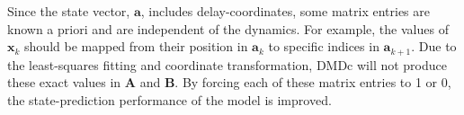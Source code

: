     Since the state vector, $\bm{a}$, includes delay-coordinates, some matrix entries are known a priori and are independent of the dynamics. 
    For example, the values of $\bm{x}_{k}$ should be mapped from their position in $\bm{a}_k$ to specific indices in $\bm{a}_{k+1}$. 
    Due to the least-squares fitting and coordinate transformation, DMDc will not produce these exact values in $\bm{A}$ and $\bm{B}$. 
    By forcing each of these matrix entries to 1 or 0, the state-prediction performance of the model is improved.



